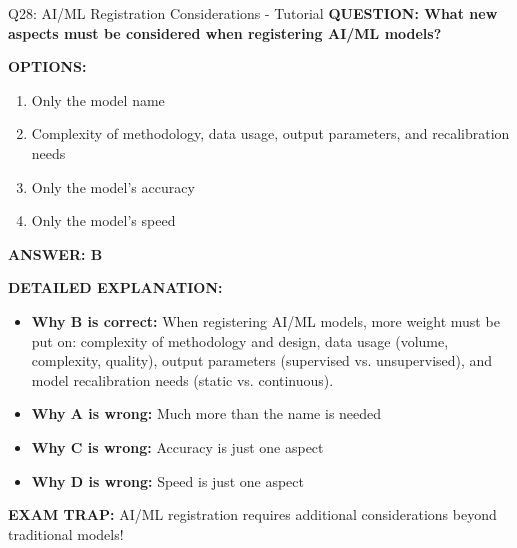 \documentclass[8pt]{beamer}
\begin{document}
	\begin{frame}{Q28: AI/ML Registration Considerations - Tutorial}
		\fontsize{6.5}{7.5}\selectfont
		\textbf{QUESTION: What new aspects must be considered when registering AI/ML models?}
		
		\vspace{0.1cm}
		\textbf{OPTIONS:}
		\begin{enumerate}
			\item Only the model name
			\item Complexity of methodology, data usage, output parameters, and recalibration needs
			\item Only the model's accuracy
			\item Only the model's speed
		\end{enumerate}
		
		\vspace{0.1cm}
		\textcolor{myblue}{\textbf{ANSWER: B}}
		
		\vspace{0.1cm}
		\textbf{DETAILED EXPLANATION:}
		\begin{itemize}
			\item \textbf{Why B is correct:} When registering AI/ML models, more weight must be put on: complexity of methodology and design, data usage (volume, complexity, quality), output parameters (supervised vs. unsupervised), and model recalibration needs (static vs. continuous).
			\item \textbf{Why A is wrong:} Much more than the name is needed
			\item \textbf{Why C is wrong:} Accuracy is just one aspect
			\item \textbf{Why D is wrong:} Speed is just one aspect
		\end{itemize}
		
		\textcolor{myred}{\textbf{EXAM TRAP:}} AI/ML registration requires \textcolor{myblue}{additional considerations beyond traditional models}!
	\end{frame}
	
\end{document}
